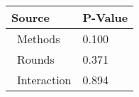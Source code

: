 
\centering
\begin{tabular}{ll}
\toprule
          Source & P-Value \\
\midrule
    \    Methods &   0.100 \\
     \    Rounds &   0.371 \\
\    Interaction &   0.894 \\
\bottomrule
\end{tabular}

